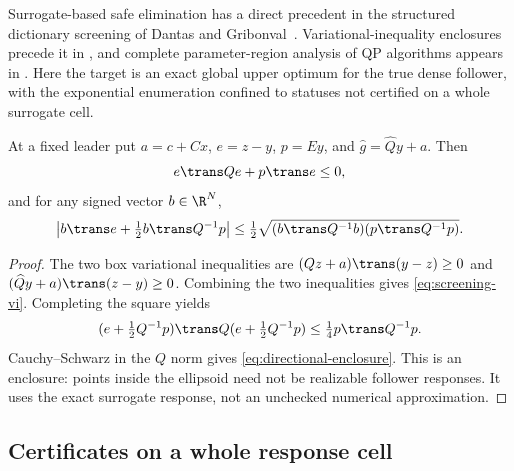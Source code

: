 Surrogate-based safe elimination has a direct precedent in the structured
dictionary screening of Dantas and Gribonval~\cite{DantasGribonval2019}.
Variational-inequality enclosures precede it in
\cite{LiuZhaoWangYe2014}, and complete parameter-region analysis of
QP algorithms appears in \cite{ArnstromAxehill2020}. Here the target
is an exact global upper optimum for the true dense follower, with the
exponential enumeration confined to statuses not certified on a whole
surrogate cell.

\begin{lemma}\label{lem:screening-enclosure}
At a fixed leader put $a=c+Cx$, $e=z-y$, $p=Ey$, and
$\widehat g=\widehat Qy+a$. Then
\begin{equation}\label{eq:screening-vi}
                  e\trans Qe+p\trans e\le0,
\end{equation}
and for any signed vector $b\in\R^N$,
\begin{equation}\label{eq:directional-enclosure}
 \left|b\trans e+\tfrac12b\trans Q^{-1}p\right|
       \le\tfrac12\sqrt{(b\trans Q^{-1}b)(p\trans Q^{-1}p)}.
\end{equation}
\end{lemma}
\begin{proof}
The two box variational inequalities are
$(Qz+a)\trans(y-z)\ge0$ and
$(\widehat Qy+a)\trans(z-y)\ge0$.
Combining the two inequalities gives \eqref{eq:screening-vi}. Completing the square yields
\[
 (e+\tfrac12Q^{-1}p)\trans Q(e+\tfrac12Q^{-1}p)
                         \le\tfrac14p\trans Q^{-1}p.
\]
Cauchy--Schwarz in the $Q$ norm gives
\eqref{eq:directional-enclosure}. This is an enclosure: points inside
the ellipsoid need not be realizable follower responses. It uses the
exact surrogate response, not an unchecked numerical approximation.
\end{proof}

\subsection{Certificates on a whole response cell}\label{subsec:whole-cell-screening}

